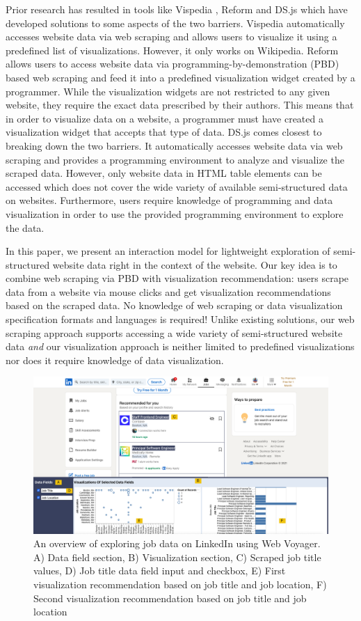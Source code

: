 \documentclass[sigconf,screen]{acmart}
\begin{document}
Prior research has resulted in tools like Vispedia \citep{chan2008},
Reform \citep{toomim2009} and DS.js \citep{zhang2017} which have
developed solutions to some aspects of the two barriers. Vispedia
automatically accesses website data via web scraping and allows users to
visualize it using a predefined list of visualizations. However, it only
works on Wikipedia. Reform allows users to access website data via
programming-by-demonstration (PBD) based web scraping and feed it into a
predefined visualization widget created by a programmer. While the
visualization widgets are not restricted to any given website, they
require the exact data prescribed by their authors. This means that in
order to visualize data on a website, a programmer must have created a
visualization widget that accepts that type of data. DS.js comes closest
to breaking down the two barriers. It automatically accesses website
data via web scraping and provides a programming environment to analyze
and visualize the scraped data. However, only website data in HTML table
elements can be accessed which does not cover the wide variety of
available semi-structured data on websites. Furthermore, users require
knowledge of programming and data visualization in order to use the
provided programming environment to explore the data.

In this paper, we present an interaction model for lightweight
exploration of semi-structured website data right in the context of the
website. Our key idea is to combine web scraping via PBD with
visualization recommendation: users scrape data from a website via mouse
clicks and get visualization recommendations based on the scraped data.
No knowledge of web scraping or data visualization specification formats
and languages is required! Unlike existing solutions, our web scraping
approach supports accessing a wide variety of semi-structured website
data \emph{and} our visualization approach is neither limited to
predefined visualizations nor does it require knowledge of data
visualization.

\begin{figure}
  \includegraphics[width=\textwidth]{media/example.png}
  \caption{\label{fig:example}An overview of exploring job data on LinkedIn using Web Voyager. A) Data field section, B) Visualization section, C) Scraped job title values, D) Job title data field input and checkbox, E) First visualization recommendation based on job title and job location, F) Second visualization recommendation based on job title and job location}
\end{figure}
\end{document}
